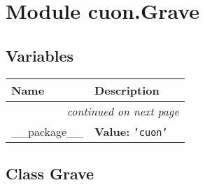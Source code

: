 %
%
%


\section{Module cuon.Grave}

    \label{cuon:Grave}


  \subsection{Variables}

    \vspace{-1cm}
\hspace{\varindent}\begin{longtable}{|p{\varnamewidth}|p{\vardescrwidth}|l}
\cline{1-2}
\cline{1-2} \centering \textbf{Name} & \centering \textbf{Description}& \\
\cline{1-2}
\endhead\cline{1-2}\multicolumn{3}{r}{\small\textit{continued on next page}}\\\endfoot\cline{1-2}
\endlastfoot\raggedright \_\-\_\-p\-a\-c\-k\-a\-g\-e\-\_\-\_\- & \raggedright \textbf{Value:} 
{\tt \texttt{'}\texttt{cuon}\texttt{'}}&\\
\cline{1-2}
\end{longtable}



\subsection{Class Grave}

